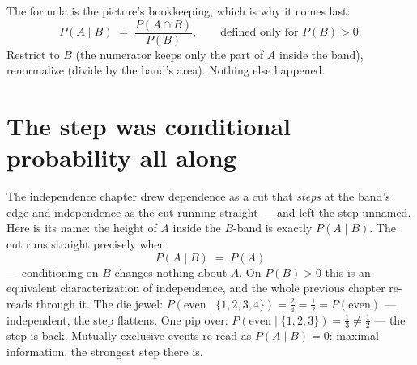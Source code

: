 \begin{narrative}
\begin{center}
\end{center}

The formula is the picture's bookkeeping, which is why it comes last:
\[
  P(A \mid B) \;=\; \frac{P(A \cap B)}{P(B)},
  \qquad\text{defined only for } P(B) > 0 .
\]
Restrict to $B$ (the numerator keeps only the part of $A$ inside the
band), renormalize (divide by the band's area). Nothing else happened.

\section{The step was conditional probability all along}

The independence chapter drew dependence as a cut that \emph{steps} at
the band's edge and independence as the cut running straight — and left
the step unnamed. Here is its name: the height of $A$ inside the
$B$-band is exactly $P(A \mid B)$. The cut runs straight precisely when
\[
  P(A \mid B) \;=\; P(A)
\]
— conditioning on $B$ changes nothing about $A$. On $P(B) > 0$ this is
an equivalent characterization of independence, and the whole previous
chapter re-reads through it. The die jewel:
$P(\text{even} \mid \{1,2,3,4\}) = \tfrac24 = \tfrac12 = P(\text{even})$
— independent, the step flattens. One pip over:
$P(\text{even} \mid \{1,2,3\}) = \tfrac13 \neq \tfrac12$ — the step is
back. Mutually exclusive events re-read as $P(A \mid B) = 0$: maximal
information, the strongest step there is.


\end{narrative}
